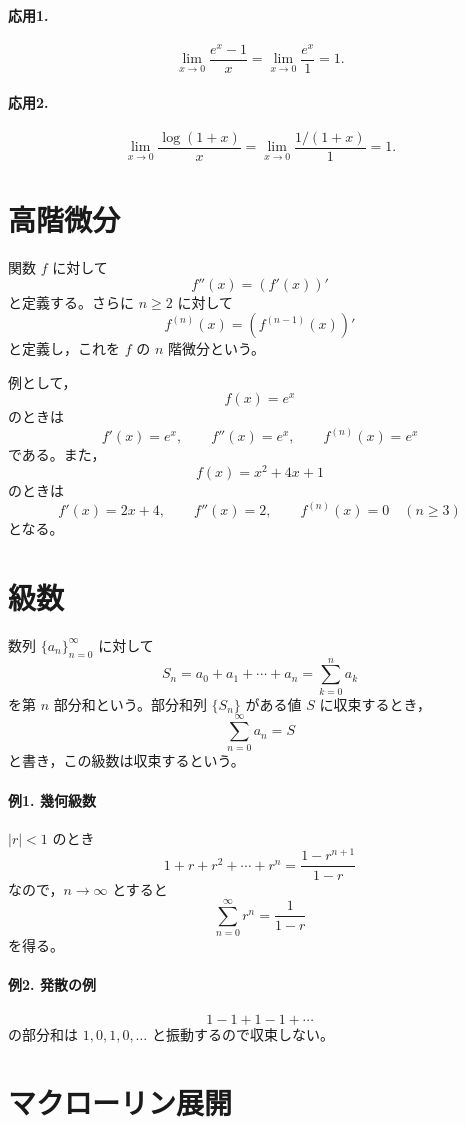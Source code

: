 \documentclass[a4paper,12pt]{jsarticle}
\theoremstyle{definition}
\begin{document}
\paragraph{応用1.}
\[
\lim_{x\to 0}\frac{e^x-1}{x}
=\lim_{x\to 0}\frac{e^x}{1}=1.
\]

\paragraph{応用2.}
\[
\lim_{x\to 0}\frac{\log(1+x)}{x}
=\lim_{x\to 0}\frac{1/(1+x)}{1}=1.
\]

\section{高階微分}

関数 $f$ に対して
\[
f''(x)=(f'(x))'
\]
と定義する。さらに $n\geq 2$ に対して
\[
f^{(n)}(x)=\left(f^{(n-1)}(x)\right)'
\]
と定義し，これを $f$ の $n$ 階微分という。

例として，
\[
f(x)=e^x
\]
のときは
\[
f'(x)=e^x,\qquad f''(x)=e^x,\qquad f^{(n)}(x)=e^x
\]
である。また，
\[
f(x)=x^2+4x+1
\]
のときは
\[
f'(x)=2x+4,\qquad f''(x)=2,\qquad f^{(n)}(x)=0\quad(n\geq 3)
\]
となる。

\section{級数}

数列 $\{a_n\}_{n=0}^{\infty}$ に対して
\[
S_n=a_0+a_1+\cdots+a_n=\sum_{k=0}^n a_k
\]
を第 $n$ 部分和という。部分和列 $\{S_n\}$ がある値 $S$ に収束するとき，
\[
\sum_{n=0}^{\infty} a_n=S
\]
と書き，この級数は収束するという。

\paragraph{例1. 幾何級数}
$|r|<1$ のとき
\[
1+r+r^2+\cdots+r^n=\frac{1-r^{n+1}}{1-r}
\]
なので，$n\to\infty$ とすると
\[
\sum_{n=0}^{\infty} r^n=\frac{1}{1-r}
\]
を得る。

\paragraph{例2. 発散の例}
\[
1-1+1-1+\cdots
\]
の部分和は $1,0,1,0,\dots$ と振動するので収束しない。

\section{マクローリン展開}
\end{document}
